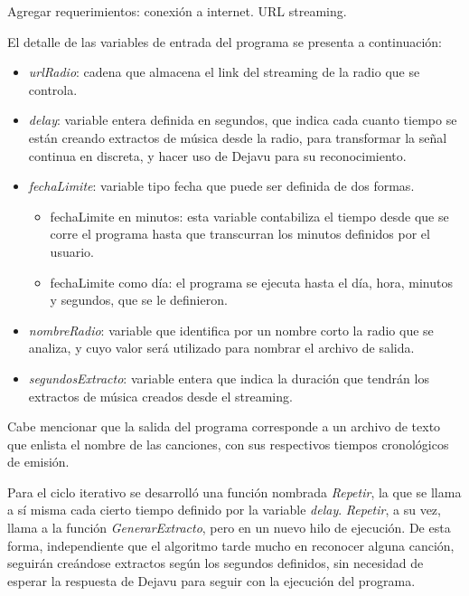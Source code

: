\begin{framed}

Agregar requerimientos: conexión a internet. URL streaming.

\end{framed}

El detalle de las variables de entrada del programa se presenta a continuación:

\begin{itemize}
\item \textit{urlRadio}: cadena que almacena el link del streaming de la radio que se controla.
\item \textit{delay}: variable entera definida en segundos, que indica cada cuanto tiempo se están creando extractos de música desde la radio, para transformar la señal continua en discreta, y hacer uso de Dejavu para su reconocimiento.

\item \textit{fechaLimite}: variable tipo fecha que puede ser definida de dos formas.

\begin{itemize}
\item fechaLimite en minutos: esta variable contabiliza el tiempo desde que se corre el programa hasta que transcurran los minutos definidos por el usuario.
\item fechaLimite como día: el programa se ejecuta hasta el día, hora, minutos y segundos, que se le definieron.
\end{itemize}

\item \textit{nombreRadio}: variable que identifica por un nombre corto la radio que se analiza, y cuyo valor será utilizado para nombrar el archivo de salida.

\item \textit{segundosExtracto}: variable entera que indica la duración que tendrán los extractos de música creados desde el streaming.

\end{itemize}

Cabe mencionar que la salida del programa corresponde a un archivo de texto que enlista el nombre de las canciones, con sus respectivos tiempos cronológicos de emisión.

Para el ciclo iterativo se desarrolló una función nombrada \textit{Repetir}, la que se llama a sí misma cada cierto tiempo definido por la variable \textit{delay}. \textit{Repetir}, a su vez, llama a la función \textit{GenerarExtracto}, pero en un nuevo hilo de ejecución. De esta forma, independiente que el algoritmo tarde mucho en reconocer alguna canción, seguirán creándose extractos según los segundos definidos, sin necesidad de esperar la respuesta de Dejavu para seguir con la ejecución del programa.


